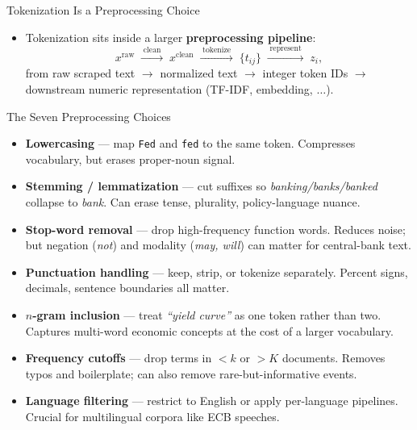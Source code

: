 \begin{frame}{Tokenization Is a Preprocessing Choice}
\begin{itemize}
\item Tokenization sits inside a larger \textbf{preprocessing pipeline}:
\[
   x^{\text{raw}} \;\xrightarrow{\;\text{clean}\;}\; x^{\text{clean}}
   \;\xrightarrow{\;\text{tokenize}\;}\; \{t_{ij}\}
   \;\xrightarrow{\;\text{represent}\;}\; z_i,
\]
from raw scraped text $\to$ normalized text $\to$ integer token IDs $\to$ downstream numeric representation (TF-IDF, embedding, $\ldots$).

\end{itemize}
\end{frame}

\begin{frame}{The Seven Preprocessing Choices}
\small
\begin{itemize}
\item \textbf{Lowercasing} --- map \texttt{Fed} and \texttt{fed} to the same token. Compresses vocabulary, but erases proper-noun signal.
\item \textbf{Stemming / lemmatization} --- cut suffixes so \emph{banking/banks/banked} collapse to \emph{bank}. Can erase tense, plurality, policy-language nuance.
\item \textbf{Stop-word removal} --- drop high-frequency function words. Reduces noise; but negation (\emph{not}) and modality (\emph{may, will}) can matter for central-bank text.
\item \textbf{Punctuation handling} --- keep, strip, or tokenize separately. Percent signs, decimals, sentence boundaries all matter.
\item \textbf{$n$-gram inclusion} --- treat \emph{``yield curve''} as one token rather than two. Captures multi-word economic concepts at the cost of a larger vocabulary.
\item \textbf{Frequency cutoffs} --- drop terms in $<k$ or $>K$ documents. Removes typos and boilerplate; can also remove rare-but-informative events.
\item \textbf{Language filtering} --- restrict to English or apply per-language pipelines. Crucial for multilingual corpora like ECB speeches.
\end{itemize}

\end{frame}


